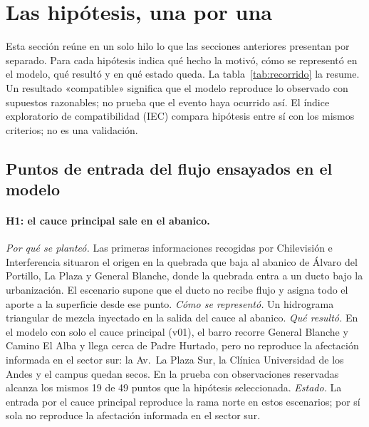 \section{Las hipótesis, una por una}\label{sec:recorrido}
Esta sección reúne en un solo hilo lo que las secciones anteriores presentan por separado. Para cada hipótesis indica qué hecho la motivó, cómo se representó en el modelo, qué resultó y en qué estado queda. La tabla~\ref{tab:recorrido} la resume. Un resultado «compatible» significa que el modelo reproduce lo observado con supuestos razonables; no prueba que el evento haya ocurrido así. El índice exploratorio de compatibilidad (IEC) compara hipótesis entre sí con los mismos criterios; no es una validación.

\subsection{Puntos de entrada del flujo ensayados en el modelo}
\paragraph{H1: el cauce principal sale en el abanico.} \emph{Por qué se planteó.} Las primeras informaciones recogidas por Chilevisión e Interferencia situaron el origen en la quebrada que baja al abanico de Álvaro del Portillo, La Plaza y General Blanche, donde la quebrada entra a un ducto bajo la urbanización. El escenario supone que el ducto no recibe flujo y asigna todo el aporte a la superficie desde ese punto. \emph{Cómo se representó.} Un hidrograma triangular de mezcla inyectado en la salida del cauce al abanico. \emph{Qué resultó.} En el modelo con solo el cauce principal (v01), el barro recorre General Blanche y Camino El Alba y llega cerca de Padre Hurtado, pero no reproduce la afectación informada en el sector sur: la Av.\ La Plaza Sur, la Clínica Universidad de los Andes y el campus quedan secos. En la prueba con observaciones reservadas alcanza los mismos 19 de 49 puntos que la hipótesis seleccionada. \emph{Estado.} La entrada por el cauce principal reproduce la rama norte en estos escenarios; por sí sola no reproduce la afectación informada en el sector sur.

